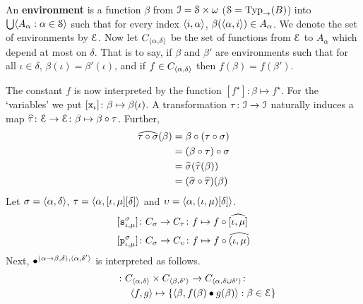 An \textbf{environment} 
is a function $\beta$ from $\mathcal{I} = \mathcal{S} \times \omega$ 
($\mathcal{S} = \operatorname{Typ}_{\rightarrow}(B)$) into $\bigcup \langle A_{\alpha} : \alpha \in \mathcal{S}\rangle$ 
such that for every index $\langle i, \alpha\rangle$, 
$\beta(\langle \alpha, i\rangle) \in A_{\alpha}$. We denote the set of 
environments by $\mathcal{E}$. Now let $C_{\langle \alpha, \delta\rangle}$
be the set of functions from $\mathcal{E}$ to $A_{\alpha}$ which depend 
at most on $\delta$. That is to say, if $\beta$ and $\beta'$ are 
environments such that for all $\iota \in \delta$, $\beta(\iota) = 
\beta'(\iota)$, and if $f \in C_{\langle \alpha, \delta\rangle}$ then 
$f(\beta) = f(\beta')$.

The constant $f$ is now interpreted by the function 
$[f^{\star}] \colon \beta \mapsto f^{\star}$. For the `variables' 
we put $[\mbox{\tt x}_{\iota}] \colon \beta \mapsto \beta(\iota)$. 
A transformation $\tau \colon \mathcal{I} \rightarrow \mathcal{I}$ naturally induces a map 
$\widehat{\tau} \colon \mathcal{E} \rightarrow \mathcal{E} \colon \beta \mapsto \beta \circ \tau$. 
Further,
\begin{equation}
\begin{split}
\widehat{\tau \circ \sigma}(\beta) &
= \beta \circ (\tau \circ \sigma) \\
&
= (\beta \circ \tau) \circ \sigma \\
&
= \widehat{\sigma}(\widehat{\tau}(\beta)) \\
&
= (\widehat{\sigma} \circ \widehat{\tau})(\beta)
\end{split}
\end{equation}
Let $\sigma = \langle \alpha, \delta\rangle$, $\tau = \langle \alpha, 
[\iota, \mu][\delta]\rangle$ and $\upsilon = \langle \alpha, 
(\iota, \mu)[\delta]\rangle$.
\begin{align}
\mbox{}[\mbox{\tt s}^{\sigma}_{\iota, \mu}] & \colon 
C_{\sigma} \rightarrow C_{\tau} \colon f \mapsto f \circ \widehat{[\iota, \mu]} \\
\mbox{}[\mbox{\tt p}^{\sigma}_{\iota, \mu}] & \colon 
C_{\sigma} \rightarrow C_{\upsilon} \colon f \mapsto f \circ \widehat{(\iota, \mu)}
\end{align}
Next, $\bullet^{\langle \alpha\rightarrow\beta, \delta\rangle, \langle \alpha, \delta'\rangle}$ 
is interpreted as follows.
\begin{multline}
[\bullet^{\auf \alpha\pf\beta, \delta\zu, \auf \alpha, \delta'\zu}] \colon
    C_{\auf \alpha, \delta\zu} \times C_{\auf \beta, \delta'\zu} 
	\pf C_{\auf \alpha, \delta\cup\delta'\zu} \colon \\
	\qquad\qquad
	\auf f, g\zu \mapsto
    \{\auf \beta, f(\beta) \bullet g(\beta)\zu : \beta \in \CE\}
\end{multline}
